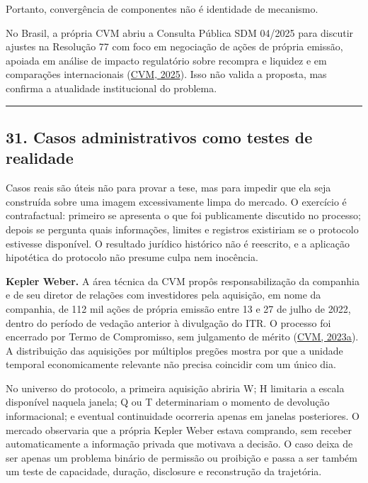 \documentclass[
  a4paper,
]{article}
\begin{document}
Portanto, convergência de componentes não é identidade de mecanismo.

No Brasil, a própria CVM abriu a Consulta Pública SDM 04/2025 para
discutir ajustes na Resolução 77 com foco em negociação de ações de
própria emissão, apoiada em análise de impacto regulatório sobre
recompra e liquidez e em comparações internacionais
(\protect\hyperlink{ref-11}{CVM, 2025}). Isso não valida a proposta, mas
confirma a atualidade institucional do problema.

\begin{center}\rule{0.5\linewidth}{0.5pt}\end{center}

\hypertarget{31-casos-administrativos-como-testes-de-realidade}{}

\hypertarget{31-casos-administrativos-como-testes-de-realidade}{%
\subsection{31. Casos administrativos como testes de
realidade}\label{31-casos-administrativos-como-testes-de-realidade}}

Casos reais são úteis não para provar a tese, mas para impedir que ela
seja construída sobre uma imagem excessivamente limpa do mercado. O
exercício é contrafactual: primeiro se apresenta o que foi publicamente
discutido no processo; depois se pergunta quais informações, limites e
registros existiriam se o protocolo estivesse disponível. O resultado
jurídico histórico não é reescrito, e a aplicação hipotética do
protocolo não presume culpa nem inocência.

\textbf{Kepler Weber.} A área técnica da CVM propôs responsabilização da
companhia e de seu diretor de relações com investidores pela aquisição,
em nome da companhia, de 112 mil ações de própria emissão entre 13 e 27
de julho de 2022, dentro do período de vedação anterior à divulgação do
ITR. O processo foi encerrado por Termo de Compromisso, sem julgamento
de mérito (\protect\hyperlink{ref-12}{CVM, 2023a}). A distribuição das
aquisições por múltiplos pregões mostra por que a unidade temporal
economicamente relevante não precisa coincidir com um único dia.

No universo do protocolo, a primeira aquisição abriria W; H limitaria a
escala disponível naquela janela; Q ou T determinariam o momento de
devolução informacional; e eventual continuidade ocorreria apenas em
janelas posteriores. O mercado observaria que a própria Kepler Weber
estava comprando, sem receber automaticamente a informação privada que
motivava a decisão. O caso deixa de ser apenas um problema binário de
permissão ou proibição e passa a ser também um teste de capacidade,
duração, disclosure e reconstrução da trajetória.
\end{document}
